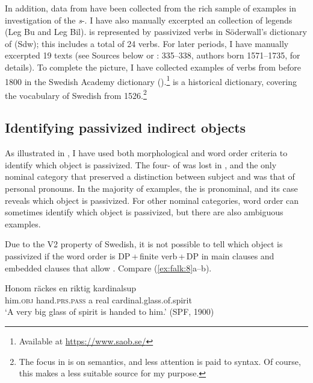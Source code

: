 \documentclass[output=paper]{langscibook}
\begin{document}
In addition, data from  have been collected from the rich sample of examples in  investigation of the \textit{s}{}-. I have also manually excerpted an  collection of legends (Leg Bu and Leg Bil).  is represented by passivized  verbs in Söderwall’s dictionary of  (Sdw); this includes a total of 24 verbs. For later periods, I have manually excerpted 19 texts (see Sources below or \citealt{Falk1993}: 335–338, authors born 1571–1735, for details). To complete the picture, I have collected examples of  verbs from before 1800 in the Swedish Academy dictionary ().\footnote{Available at \url{https://www.saob.se/}}   is a historical dictionary, covering the vocabulary of Swedish from 1526.\footnote{The focus in  is on semantics, and less attention is paid to syntax. Of course, this makes  a less suitable source for my purpose.}


\subsection{Identifying passivized indirect objects}\label{sec:falk:3.2}


As illustrated in , I have used both morphological and word order criteria to identify which object is passivized. The four- of  was lost in , and the only nominal category that preserved a distinction between subject and  was that of personal pronouns. In the majority of examples, the  is pronominal, and its case reveals which object is passivized. For other nominal categories, word order can sometimes identify which object is passivized, but there are also ambiguous examples.


Due to the V2 property of Swedish, it is not possible to tell which object is passivized if the word order is DP\,+\,finite verb\,+\,DP in main clauses and embedded clauses that allow . Compare (\ref{ex:falk:8}a–b).


\ea%
    \label{ex:falk:8}
\ea \label{ex:falk:8a}
\gll Honom  räckes        en    riktig  kardinalsup\\
      him.\textsc{obj}  hand\textsc{.prs}.\textsc{pass}  a      real   cardinal.glass.of.spirit\\
\glt ‘A very big glass of spirit is handed to him.’ (SPF, 1900)
\end{document}
